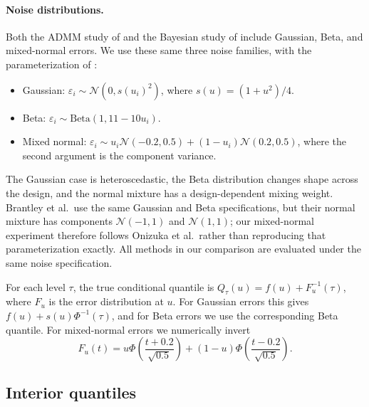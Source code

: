 \paragraph{Noise distributions.} Both the ADMM study of \citet{brantley2020baseline} and the Bayesian study of \citet{onizuka2024fast} include Gaussian, Beta, and mixed-normal errors. We use these same three noise families, with the parameterization of \citet{onizuka2024fast}:
\begin{itemize}
 \item Gaussian: $\varepsilon_i\sim\mathcal{N}(0,s(u_i)^2)$, where $s(u)=(1+u^2)/4$.
 \item Beta: $\varepsilon_i\sim\mathrm{Beta}(1,11-10u_i)$.
 \item Mixed normal: $\varepsilon_i\sim u_i\mathcal{N}(-0.2,0.5)+(1-u_i)\mathcal{N}(0.2,0.5)$, where the second argument is the component variance.
\end{itemize}
The Gaussian case is heteroscedastic, the Beta distribution changes shape across the design, and the normal mixture has a design-dependent mixing weight. Brantley et al.\ use the same Gaussian and Beta specifications, but their normal mixture has components $\mathcal{N}(-1,1)$ and $\mathcal{N}(1,1)$; our mixed-normal experiment therefore follows Onizuka et al.\ rather than reproducing that parameterization exactly. All methods in our comparison are evaluated under the same noise specification.

For each level $\tau$, the true conditional quantile is $Q_\tau(u)=f(u)+F_u^{-1}(\tau)$, where $F_u$ is the error distribution at $u$. For Gaussian errors this gives $f(u)+s(u)\Phi^{-1}(\tau)$, and for Beta errors we use the corresponding Beta quantile. For mixed-normal errors we numerically invert
\[
 F_u(t)=u\Phi\!\left(\frac{t+0.2}{\sqrt{0.5}}\right)
       +(1-u)\Phi\!\left(\frac{t-0.2}{\sqrt{0.5}}\right).
\]

\subsection{Interior quantiles}
\label{sec:sim:individual}

